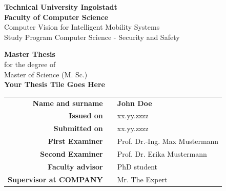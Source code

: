 \begin{titlepage}
	
	\begin{center}	
		\vspace{1cm}
		\huge\textbf{Technical University Ingolstadt}\\[1em]
		\Large \textbf{Faculty of Computer Science}\\ 
		\normalsize
		Computer Vision for Intelligent Mobility Systems \\ 
		Study Program Computer Science - Security and Safety \\ [2.5em]
	\end{center}


	\begin{center}	
		\vspace{1cm}
		\Large \textbf{Master Thesis}\\ 
		\normalsize
		for the degree of \\ 
		Master of Science (M. Sc.) \\ [3.5em]
		\huge\textbf{Your Thesis Tile Goes Here}	 \\ [3.5em]
	\end{center}



	
	\begin{center}
		\vspace{1cm}
		\hspace{1cm}
		\begin{tabular}{r@{:}ll}
			\textbf{Name and surname} & & \textbf{John Doe}	\\ [3em]
			
			\textbf{Issued on}	& & xx.yy.zzzz	\\ [1em] %
			\textbf{Submitted on}	& & xx.yy.zzzz	\\ [3em] %
			
			\textbf{First Examiner} &	& Prof. Dr.-Ing. Max Mustermann	\\ [1em]
			\textbf{Second Examiner} 	& & Prof. Dr. Erika Mustermann	\\[3em]
			
			\textbf{Faculty advisor} &	& PhD student \\ [1em] %
			\textbf{Supervisor at COMPANY} &	& Mr. The Expert \\ %
		\end{tabular}
	\end{center}
	
\end{titlepage}

\restoregeometry